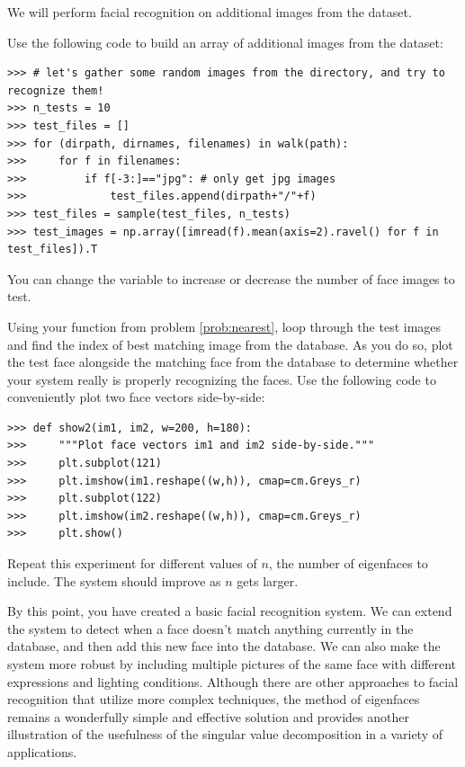 \begin{problem}
\label{prob:match}
We will perform facial recognition on additional images from the  dataset.


Use the following code to build an array of additional images from the dataset:
\begin{lstlisting}
>>> # let's gather some random images from the directory, and try to recognize them!
>>> n_tests = 10
>>> test_files = []
>>> for (dirpath, dirnames, filenames) in walk(path):
>>>     for f in filenames:
>>>         if f[-3:]=="jpg": # only get jpg images
>>>             test_files.append(dirpath+"/"+f)
>>> test_files = sample(test_files, n_tests)
>>> test_images = np.array([imread(f).mean(axis=2).ravel() for f in test_files]).T
\end{lstlisting}
You can change the variable  to increase or decrease the number of face images to test.

Using your function  from problem \ref{prob:nearest}, loop through the test images and find
the index of best matching image from the database.
As you do so, plot the test face alongside the matching face from the database to determine whether your system
really is properly recognizing the faces.
Use the following code to conveniently plot two face vectors side-by-side:
\begin{lstlisting}
>>> def show2(im1, im2, w=200, h=180):
>>>     """Plot face vectors im1 and im2 side-by-side."""
>>>     plt.subplot(121)
>>>     plt.imshow(im1.reshape((w,h)), cmap=cm.Greys_r)
>>>     plt.subplot(122)
>>>     plt.imshow(im2.reshape((w,h)), cmap=cm.Greys_r)
>>>     plt.show()
\end{lstlisting}

Repeat this experiment for different values of $n$, the number of eigenfaces to include.
The system should improve as $n$ gets larger.
\end{problem}

By this point, you have created a basic facial recognition system.
We can extend the system to detect when a face doesn't match anything currently in the database, and then add this new face into the database.
We can also make the system more robust by including multiple pictures of the same face with different expressions and lighting conditions.
Although there are other approaches to facial recognition that utilize more complex techniques, the method of eigenfaces remains
a wonderfully simple and effective solution and provides another illustration of the usefulness of the singular value decomposition in a variety of applications.

